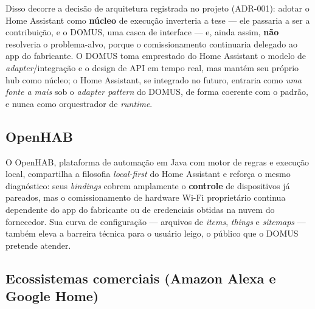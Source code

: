 Disso decorre a decisão de arquitetura registrada no projeto (ADR-001): adotar o
Home Assistant como \textbf{núcleo} de execução inverteria a tese --- ele passaria
a ser a contribuição, e o DOMUS, uma casca de interface --- e, ainda assim,
\textbf{não} resolveria o problema-alvo, porque o comissionamento continuaria
delegado ao app do fabricante. O DOMUS toma emprestado do Home Assistant o modelo
de \textit{adapter}/integração e o design de API em tempo real, mas mantém seu
próprio hub como núcleo; o Home Assistant, se integrado no futuro, entraria como
\emph{uma fonte a mais} sob o \textit{adapter pattern} do DOMUS, de forma coerente
com o padrão, e nunca como orquestrador de \textit{runtime}.

\subsection{OpenHAB}\label{sec:openhab}

O OpenHAB, plataforma de automação em Java com motor de regras e execução local,
compartilha a filosofia \textit{local-first} do Home Assistant e reforça o mesmo
diagnóstico: seus \textit{bindings} cobrem amplamente o \textbf{controle} de
dispositivos já pareados, mas o comissionamento de hardware Wi-Fi proprietário
continua dependente do app do fabricante ou de credenciais obtidas na nuvem do
fornecedor. Sua curva de configuração --- arquivos de \textit{items}, \textit{things}
e \textit{sitemaps} --- também eleva a barreira técnica para o usuário leigo, o
público que o DOMUS pretende atender.

\subsection{Ecossistemas comerciais (Amazon Alexa e Google Home)}\label{sec:comerciais}

